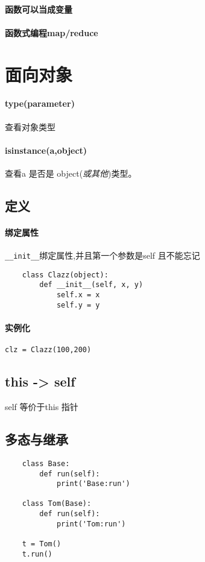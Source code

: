 \documentclass[UTF8,a4paper,12pt]{ctexbook}
\begin{document}
		\paragraph{函数可以当成变量}
		
		\paragraph{函数式编程map/reduce}
		
	\section{面向对象}
		\paragraph{type(parameter)} 查看对象类型
		
		\paragraph{isinstance(a,object)} 查看a 是否是 object(\textit{或其他})类型。
		\subsection{定义}
			\paragraph{绑定属性}\verb|__init__|绑定属性,并且第一个参数是self 且不能忘记
			
				\begin{lstlisting}
	class Clazz(object):	
		def __init__(self, x, y)
			self.x = x
			self.y = y
				\end{lstlisting}
			
			\paragraph{实例化}\verb|clz = Clazz(100,200)|
			
		\subsection{this -> self}self 等价于this 指针
		
		\subsection{多态与继承}
			\begin{lstlisting}
	class Base:
		def run(self):
			print('Base:run')
			
	class Tom(Base):
		def run(self):
			print('Tom:run')
	
	t = Tom()
	t.run()
			\end{lstlisting}
		
\end{document}
